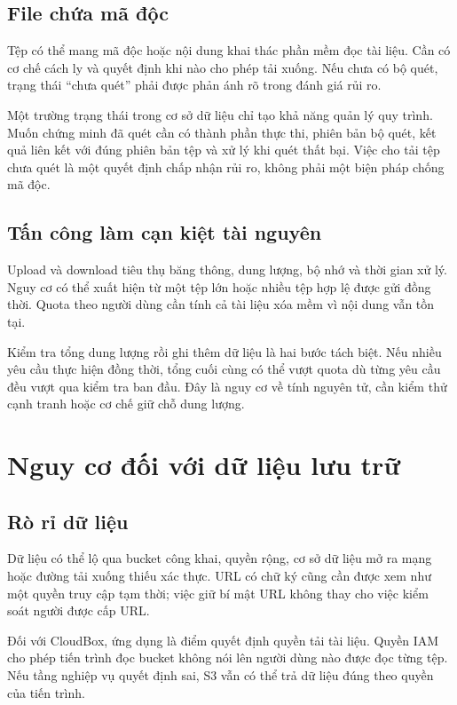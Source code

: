 \subsection{File chứa mã độc}
Tệp có thể mang mã độc hoặc nội dung khai thác phần mềm đọc tài liệu. Cần có cơ chế cách ly và quyết định khi nào cho phép tải xuống. Nếu chưa có bộ quét, trạng thái ``chưa quét'' phải được phản ánh rõ trong đánh giá rủi ro.

Một trường trạng thái trong cơ sở dữ liệu chỉ tạo khả năng quản lý quy trình. Muốn chứng minh đã quét cần có thành phần thực thi, phiên bản bộ quét, kết quả liên kết với đúng phiên bản tệp và xử lý khi quét thất bại. Việc cho tải tệp chưa quét là một quyết định chấp nhận rủi ro, không phải một biện pháp chống mã độc.
\subsection{Tấn công làm cạn kiệt tài nguyên}
Upload và download tiêu thụ băng thông, dung lượng, bộ nhớ và thời gian xử lý. Nguy cơ có thể xuất hiện từ một tệp lớn hoặc nhiều tệp hợp lệ được gửi đồng thời. Quota theo người dùng cần tính cả tài liệu xóa mềm vì nội dung vẫn tồn tại.

Kiểm tra tổng dung lượng rồi ghi thêm dữ liệu là hai bước tách biệt. Nếu nhiều yêu cầu thực hiện đồng thời, tổng cuối cùng có thể vượt quota dù từng yêu cầu đều vượt qua kiểm tra ban đầu. Đây là nguy cơ về tính nguyên tử, cần kiểm thử cạnh tranh hoặc cơ chế giữ chỗ dung lượng.

\section{Nguy cơ đối với dữ liệu lưu trữ}
\subsection{Rò rỉ dữ liệu}
Dữ liệu có thể lộ qua bucket công khai, quyền rộng, cơ sở dữ liệu mở ra mạng hoặc đường tải xuống thiếu xác thực. URL có chữ ký cũng cần được xem như một quyền truy cập tạm thời; việc giữ bí mật URL không thay cho việc kiểm soát người được cấp URL.

Đối với CloudBox, ứng dụng là điểm quyết định quyền tải tài liệu. Quyền IAM cho phép tiến trình đọc bucket không nói lên người dùng nào được đọc từng tệp. Nếu tầng nghiệp vụ quyết định sai, S3 vẫn có thể trả dữ liệu đúng theo quyền của tiến trình.
